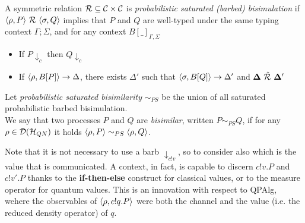 \begin{definition}
	A symmetric relation $\mathcal{R} \subseteq \mathcal{C} \times \mathcal{C}$ is \emph{probabilistic saturated (barbed) bisimulation} if $\confw{\rho, P} \ \rel\ \confw{\sigma, Q}$ implies that $P$ and $Q$  are well-typed under the same typing context $\Gamma; \Sigma$, and for any context $B[\_]_{\Gamma, \Sigma}$
	\begin{itemize}
		\item If $P \downarrow_{c}$ then $Q \downarrow_{c}$
		\item If $\langle\rho, B[P]\rangle \rightarrow \Delta$, there exists $\Delta' $ such that $\langle\sigma, B[Q]\rangle \rightarrow \Delta'$ and $\mathbf{\Delta}\ \sqlift{\rel}\ \mathbf{\Delta'}$
	\end{itemize}
	Let \emph{probabilistic saturated bisimilarity} $\sim_{PS}$ be the union of all saturated probabilistic barbed bisimulation. \\
	We say that two {processes} $P$ and $Q$ are \emph{bisimilar}, written $P \sim_{PS} Q$, if for any $\rho \in \mathcal{D}(\mathcal{H}_{QN})$ it holds $\langle\rho, P\rangle \sim_{PS} \langle\rho, Q\rangle$.
\end{definition}

Note that it is not necessary to use a barb $\downarrow_{c!v}$, so to consider also which is the value that is communicated. A context, in fact, is capable to discern $c!v.P$ and $c!v'.P$ thanks to the \textbf{if-then-else} construct for classical values, or to the measure operator for quantum values. This is an innovation with respect to QPAlg, wehere the observables of $\langle\rho, c!q.P\rangle$ were both the channel and the value (i.e. the reduced density operator) of $q$. 


